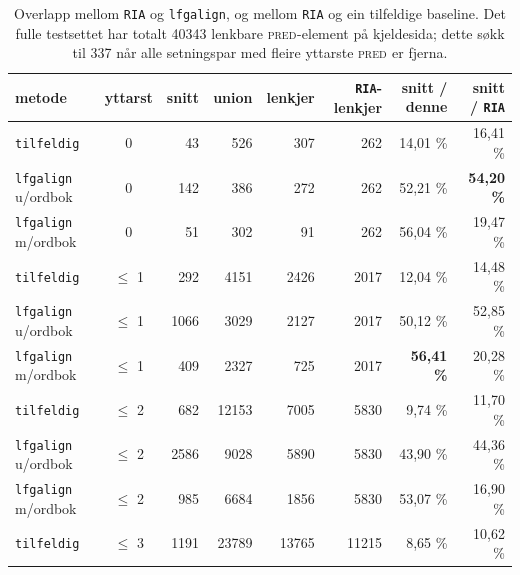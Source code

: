 \documentclass[12pt,a4paper,oneside,draft]{report}
\newcommand{\F}[2]{\textsc{#1}\ensuremath{_{#2}}}
\newcommand{\PRED}{\F{pred}{}}
\begin{document}
\begin{table}[htb]
\caption{\label{tbl:RIA}Overlapp mellom \texttt{RIA} og \texttt{lfgalign}, og mellom \texttt{RIA} og ein tilfeldige baseline. Det fulle testsettet har totalt 40343 lenkbare \PRED{}-element på kjeldesida; dette søkk til 337 når alle setningspar med fleire yttarste \PRED{} er fjerna.}
\begin{center}
\begin{tabular}{lcrrrrrr}
 metode                      &  yttarst        &  snitt  &  union  &  lenkjer  &  \texttt{RIA}-lenkjer  &  snitt / denne      &  snitt / \texttt{RIA}  \\
\hline
 \texttt{tilfeldig}          &  0              &     43  &    526  &      307  &                   262  &  14,01 \%           &  16,41 \%              \\
 \texttt{lfgalign} u/ordbok  &  0              &    142  &    386  &      272  &                   262  &  52,21 \%           &  \textbf{54,20 \%}     \\
 \texttt{lfgalign} m/ordbok  &  0              &     51  &    302  &       91  &                   262  &  56,04 \%           &  19,47 \%              \\
\hline
 \texttt{tilfeldig}          &  $\leq$ 1       &    292  &   4151  &     2426  &                  2017  &  12,04 \%           &  14,48 \%              \\
 \texttt{lfgalign} u/ordbok  &  $\leq$ 1       &   1066  &   3029  &     2127  &                  2017  &  50,12 \%           &  52,85 \%              \\
 \texttt{lfgalign} m/ordbok  &  $\leq$ 1       &    409  &   2327  &      725  &                  2017  &  \textbf{56,41 \%}  &  20,28 \%              \\
\hline
 \texttt{tilfeldig}          &  $\leq$ 2       &    682  &  12153  &     7005  &                  5830  &  9,74 \%            &  11,70 \%              \\
 \texttt{lfgalign} u/ordbok  &  $\leq$ 2       &   2586  &   9028  &     5890  &                  5830  &  43,90 \%           &  44,36 \%              \\
 \texttt{lfgalign} m/ordbok  &  $\leq$ 2       &    985  &   6684  &     1856  &                  5830  &  53,07 \%           &  16,90 \%              \\
\hline
 \texttt{tilfeldig}          &  $\leq$ 3       &   1191  &  23789  &    13765  &                 11215  &  8,65 \%            &  10,62 \%              \\

\end{tabular}
\end{center}
\end{table}
\end{document}
